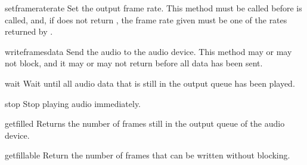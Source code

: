 \begin{methoddesc}{setframerate}{rate}
Set the output frame rate.  This method must be called before
 is called, and, if  does not return
, the frame rate given must be one of the rates returned by
.
\end{methoddesc}

\begin{methoddesc}{writeframes}{data}
Send the audio  to the audio device.  This method may or may
not block, and it may or may not return before all data has been sent.
\end{methoddesc}

\begin{methoddesc}{wait}{}
Wait until all audio data that is still in the output queue has been
played.
\end{methoddesc}

\begin{methoddesc}{stop}{}
Stop playing audio immediately.
\end{methoddesc}

\begin{methoddesc}{getfilled}{}
Returns the number of frames still in the output queue of the audio
device.
\end{methoddesc}

\begin{methoddesc}{getfillable}{}
Return the number of frames that can be written without
 blocking.
\end{methoddesc}
